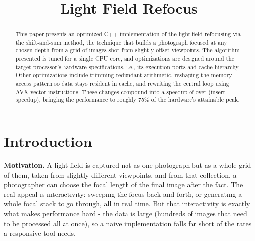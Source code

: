 \documentclass[letterpaper]{article}
\title{Light Field Refocus}
\newcommand{\mypar}[1]{{\bf #1.}}
\begin{document}
%
%



\maketitle


\begin{abstract}
This paper presents an optimized C++ implementation of the light field
refocusing via the shift-and-sum method, the technique that builds a 
photograph focused at any chosen depth from a grid of images shot from
slightly offset viewpoints.
The algorithm presented is tuned for a single CPU core, and optimizations are designed around the target
processor's hardware specifications, i.e., its execution ports and cache
hierarchy. Other optimizations include
trimming redundant arithmetic, reshaping the memory access pattern so data
stays resident in cache, and rewriting the central loop using AVX
vector instructions. These changes compound into a speedup of over
(insert speedup), bringing the performance to roughly 75\% of
the hardware's attainable peak. 
\end{abstract}


\section{Introduction}\label{sec:intro}

\mypar{Motivation}  A light field is captured not as one photograph but as a whole grid of them, taken from slightly different viewpoints, and from that collection, a photographer can choose the focal length of the final image after the fact. The real appeal is interactivity: sweeping the focus back and forth, or generating a whole focal stack to go through, all in real time. But that interactivity is exactly what makes performance hard - the data is large (hundreds of images that need to be processed all at once), so a naive implementation falls far short of the rates a responsive tool needs.
\end{document}

